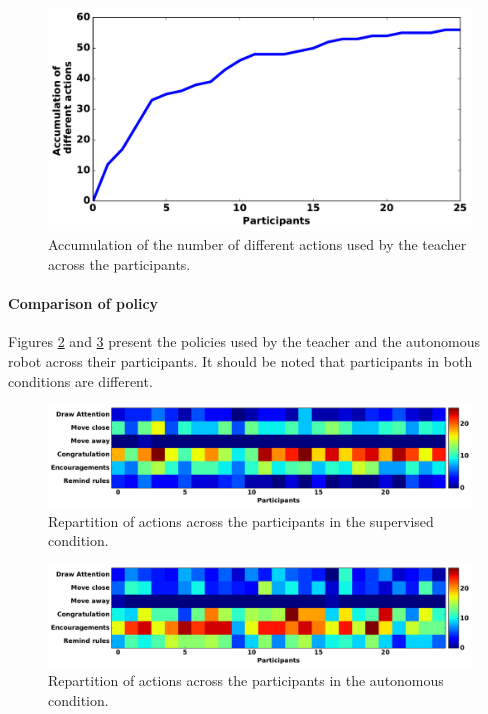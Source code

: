 \begin{figure}[ht]
	\includegraphics[width=.6\linewidth]{number_actions.pdf}
	\centering
	\caption{Accumulation of the number of different actions used by the teacher across the  participants.}
	\label{fig:supervision}
\end{figure}


\paragraph{Comparison of policy}

Figures \ref{fig:supervised_actions} and \ref{fig:autonomous_actions} present the policies used by the teacher and the autonomous robot across their participants. It should be noted that participants in both conditions are different.


\begin{figure}[ht]
	\includegraphics[width=1\linewidth]{supervised_actions.pdf}
	\centering
	\caption{Repartition of actions across the participants in the supervised condition.}
	\label{fig:supervised_actions}
\end{figure}

\begin{figure}[ht]
	\includegraphics[width=1\linewidth]{autonomous_actions.pdf}
	\centering
	\caption{Repartition of actions across the participants in the autonomous condition.}
	\label{fig:autonomous_actions}
\end{figure}

